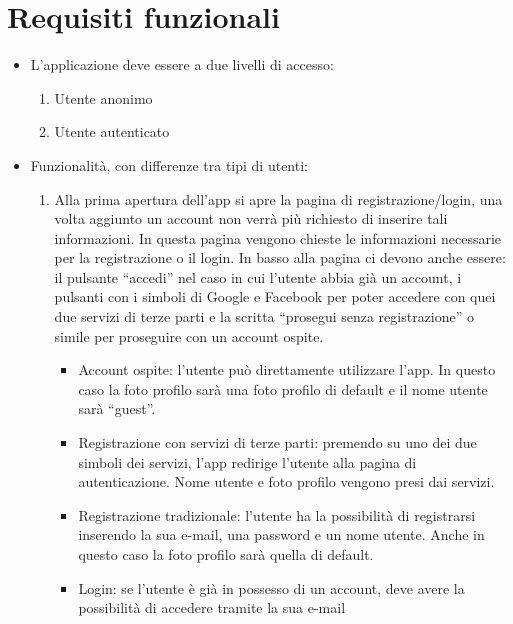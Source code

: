 \documentclass{article}
\begin{document}
\section{Requisiti funzionali}
    \begin{itemize}
        \item L’applicazione deve essere a due livelli di accesso:
            \begin{enumerate}
                \item Utente anonimo
                \item Utente autenticato
            \end{enumerate}
        \item Funzionalità, con differenze tra tipi di utenti:
            \begin{enumerate}
                \item Alla prima apertura dell’app si apre la pagina di registrazione/login, una volta aggiunto un account non verrà più
                        richiesto di inserire tali informazioni. In questa pagina vengono chieste le informazioni necessarie per la
                        registrazione o il login. In basso alla pagina ci devono anche essere: il pulsante “accedi” nel caso in cui l’utente
                        abbia già un account, i pulsanti con i simboli di Google e Facebook per poter accedere con quei due servizi di terze
                        parti e la scritta “prosegui senza registrazione” o simile per proseguire con un account ospite.
                    \begin{itemize}
                        \item Account ospite: l’utente può direttamente utilizzare l’app. In questo caso la foto profilo sarà una foto profilo di
                                default e il nome utente sarà “guest”.
                        \item Registrazione con servizi di terze parti: premendo su uno dei due simboli dei servizi, l’app redirige l’utente alla
                                pagina di autenticazione. Nome utente e foto profilo vengono presi dai servizi.
                        \item Registrazione tradizionale: l'utente ha la possibilità di registrarsi inserendo la sua e-mail, una password e un
                                nome utente. Anche in questo caso la foto profilo sarà quella di default.
                        \item Login: se l'utente è già in possesso di un account, deve avere la possibilità di accedere tramite la sua e-mail

\end{itemize}
\end{enumerate}
\end{itemize}
\end{document}
